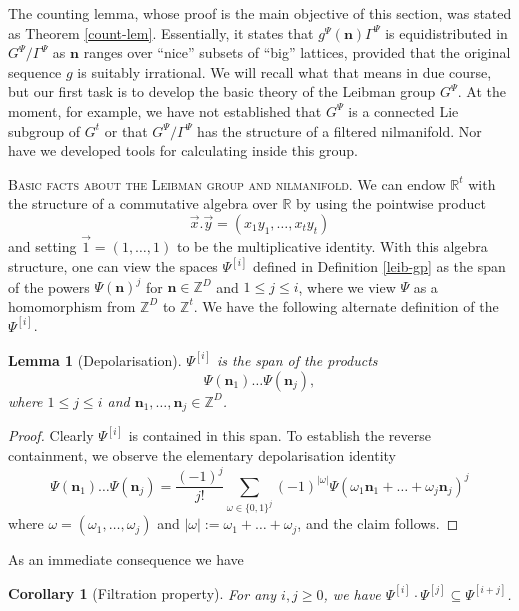 \documentclass[11pt,reqno]{amsart}
\numberwithin{equation}{section}
\theoremstyle{plain}
\newtheorem{lemma}[subsection]{Lemma}
\newtheorem{corollary}[subsection]{Corollary}
\theoremstyle{definition}
\renewcommand{\leq}{\leqslant}
\renewcommand{\geq}{\geqslant}
\newcommand\Z{\mathbb{Z}}
\newcommand\R{\mathbb{R}}
\newcommand\1{{\bf 1}}
\newcommand\2{{\bf 2}}
\begin{document}
The counting lemma, whose proof is the main objective of this section, was stated as Theorem \ref{count-lem}. Essentially, it states that $g^{\Psi}(\mathbf{n})\Gamma^{\Psi}$ is equidistributed in $G^{\Psi}/\Gamma^{\Psi}$ as $\mathbf{n}$ ranges over ``nice'' subsets of ``big'' lattices, provided that the original sequence $g$ is suitably irrational. We will recall what that means in due course, but our first task is to develop the basic theory of the Leibman group $G^{\Psi}$. At the moment, for example, we have not established that $G^{\Psi}$ is a connected Lie subgroup of $G^t$ or that $G^{\Psi}/\Gamma^{\Psi}$ has the structure of a filtered nilmanifold. Nor have we developed tools for calculating inside this group.\vspace{11pt}

\textsc{Basic facts about the Leibman group and nilmanifold.} We can endow $\R^t$ with the structure of a commutative algebra over $\R$ by using the pointwise product
$$ \vec{x}.\vec{y} = (x_1 y_1,\ldots,x_t y_t)$$
and setting $\vec{1} = (1,\ldots,1)$ to be the multiplicative identity.
With this algebra structure, one can view the spaces ${\Psi}^{[i]}$ defined in Definition \ref{leib-gp} as the span of the powers $\Psi(\mathbf{n})^j$ for $\mathbf{n} \in \Z^D$ and $1 \leq j \leq i$, where we view $\Psi$ as a homomorphism from $\Z^D$ to $\Z^t$.  We have the following alternate definition of the ${\Psi}^{[i]}$.

\begin{lemma}[Depolarisation]\label{depol}  ${\Psi}^{[i]}$ is the span of the products \[ \Psi(\mathbf{n}_1) \ldots \Psi(\mathbf{n}_j),\] where $1 \leq j \leq i$ and $\mathbf{n}_1,\ldots,\mathbf{n}_j \in \Z^D$.
\end{lemma}

\begin{proof} Clearly ${\Psi}^{[i]}$ is contained in this span.  To establish the reverse containment, we observe the elementary depolarisation identity
$$ \Psi(\mathbf{n}_1) \ldots \Psi(\mathbf{n}_j) = \frac{(-1)^j}{j!} \sum_{\omega \in \{0,1\}^j} (-1)^{|\omega|} \Psi(\omega_1 \mathbf{n}_1 + \ldots + \omega_j \mathbf{n}_j)^j$$
where $\omega = (\omega_1,\ldots,\omega_j)$ and $|\omega| := \omega_1+\ldots+\omega_j$, and the claim follows.
\end{proof}

As an immediate consequence we have

\begin{corollary}[Filtration property]\label{filtr}  For any $i,j \geq 0$, we have $\Psi^{[i]} \cdot \Psi^{[j]} \subseteq \Psi^{[i+j]}$.
\end{corollary}
\end{document}
